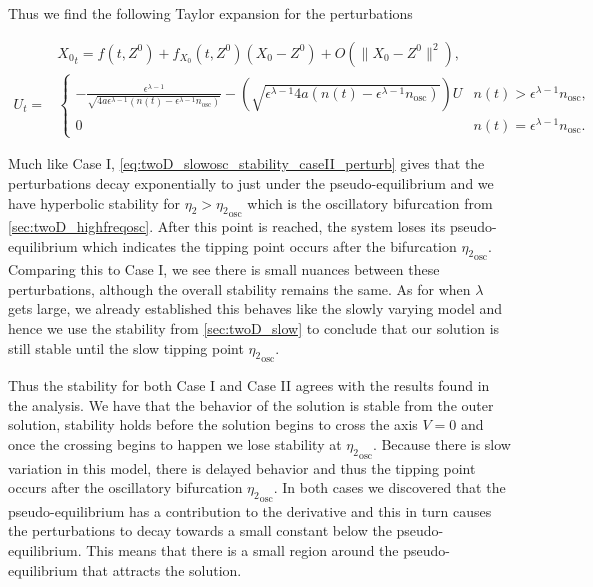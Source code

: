 Thus we find the following Taylor expansion for the perturbations

\begin{equation}\label{eq:twoD_slowosc_stability_caseII_perturb}
\begin{aligned}
&{X_0}_t = f(t,Z^0)+f_{X_0}(t,Z^0)(X_0-Z^0)+O(\lVert X_0-Z^0 \rVert^2),\\
U_t = & \begin{cases}
-\frac{\epsilon^{\lambda-1}}{\sqrt{4a\epsilon^{\lambda-1}(n(t)-\epsilon^{\lambda-1}n_{\text{osc}})}}-\left(\sqrt{\epsilon^{\lambda-1}4a(n(t)-\epsilon^{\lambda-1}n_{\text{osc}})}\right) U & n(t)>\epsilon^{\lambda-1}n_{\text{osc}},\\
0 & n(t)=\epsilon^{\lambda-1}n_{\text{osc}}.
\end{cases}
\end{aligned}
\end{equation}

Much like Case I, \eqref{eq:twoD_slowosc_stability_caseII_perturb} gives that the perturbations decay exponentially to just under the pseudo-equilibrium and we have hyperbolic stability for $\eta_2>{\eta_2}_{\text{osc}}$ which is the oscillatory bifurcation from \autoref{sec:twoD_highfreqosc}. After this point is reached, the system loses its pseudo-equilibrium which indicates the tipping point occurs after the bifurcation ${\eta_2}_{\text{osc}}$. Comparing this to Case I, we see there is small nuances between these perturbations, although the overall stability remains the same. As for when $\lambda$ gets large, we already established this behaves like the slowly varying model and hence we use the stability from \autoref{sec:twoD_slow} to conclude that our solution is still stable until the slow tipping point ${\eta_2}_{\text{osc}}$.


Thus the stability for both Case I and Case II agrees with the results found in the analysis. We have that the behavior of the solution is stable from the outer solution, stability holds before the solution begins to cross the axis $V=0$ and once the crossing begins to happen we lose stability at ${\eta_2}_{\text{osc}}$. Because there is slow variation in this model, there is delayed behavior and thus the tipping point occurs after the oscillatory bifurcation ${\eta_2}_{\text{osc}}$. In both cases we discovered that the pseudo-equilibrium has a contribution to the derivative and this in turn causes the perturbations to decay towards a small constant below the pseudo-equilibrium. This means that there is a small region around the pseudo-equilibrium that attracts the solution.
